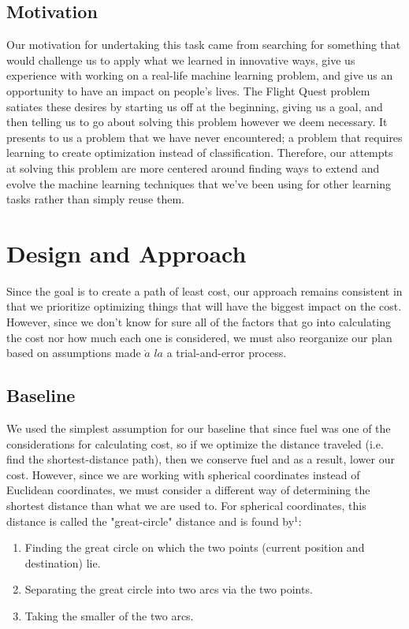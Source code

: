 \documentclass{article}[12pt]
\begin{document}
\begin{multicols}{2}
\subsection{Motivation}
Our motivation for undertaking this task came from searching for something that would challenge us to apply what we learned in innovative ways, give us experience with working on a real-life machine learning problem, and give us an opportunity to have an impact on people's lives. The Flight Quest problem satiates these desires by starting us off at the beginning, giving us a goal, and then telling us to go about solving this problem however we deem necessary. It presents to us a problem that we have never encountered; a problem that requires learning to create optimization instead of classification. Therefore, our attempts at solving this problem are more centered around finding ways to extend and evolve the machine learning techniques that we've been using for other learning tasks rather than simply reuse them.

\section{Design and Approach}
Since the goal is to create a path of least cost, our approach remains consistent in that we prioritize optimizing things that will have the biggest impact on the cost. However, since we don't know for sure all of the factors that go into calculating the cost nor how much each one is considered, we must also reorganize our plan based on assumptions made $\grave{a}$ $la$ a trial-and-error process.

\subsection{Baseline}

We used the simplest assumption for our baseline that since fuel was one of the considerations for calculating cost, so if we optimize the distance traveled (i.e. find the shortest-distance path), then we conserve fuel and as a result, lower our cost. However, since we are working with spherical coordinates instead of Euclidean coordinates, we must consider a different way of determining the shortest distance than what we are used to. For spherical coordinates, this distance is called the "great-circle" distance and is found by$^{1}$:\\

	\begin{enumerate}
		\item Finding the great circle on which the two points (current position and destination) lie.
		\item Separating the great circle into two arcs via the two points. 
		\item Taking the smaller of the two arcs.\\
	\end{enumerate}


\end{multicols}
\end{document}
